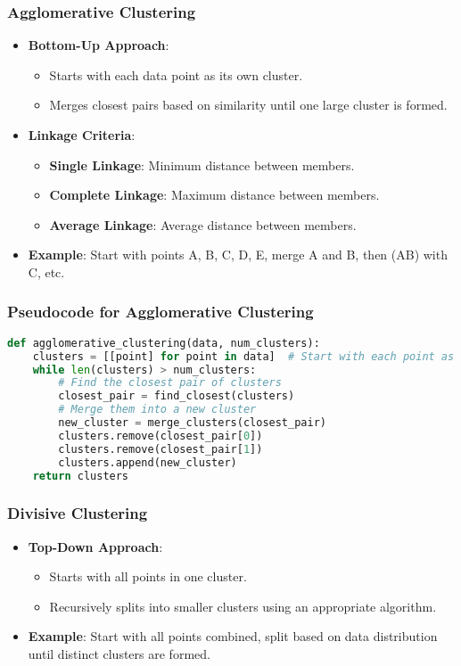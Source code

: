 \documentclass[aspectratio=169]{beamer}
\begin{document}
\begin{frame}
    \frametitle{Agglomerative Clustering}
    \begin{itemize}
        \item \textbf{Bottom-Up Approach}:
            \begin{itemize}
                \item Starts with each data point as its own cluster.
                \item Merges closest pairs based on similarity until one large cluster is formed.
            \end{itemize}
        \item \textbf{Linkage Criteria}:
            \begin{itemize}
                \item \textbf{Single Linkage}: Minimum distance between members.
                \item \textbf{Complete Linkage}: Maximum distance between members.
                \item \textbf{Average Linkage}: Average distance between members.
            \end{itemize}
        \item \textbf{Example}: 
            Start with points A, B, C, D, E, merge A and B, then (AB) with C, etc.
    \end{itemize}
\end{frame}

\begin{frame}[fragile]
    \frametitle{Pseudocode for Agglomerative Clustering}
    \begin{lstlisting}[language=Python]
def agglomerative_clustering(data, num_clusters):
    clusters = [[point] for point in data]  # Start with each point as a cluster
    while len(clusters) > num_clusters:
        # Find the closest pair of clusters
        closest_pair = find_closest(clusters)
        # Merge them into a new cluster
        new_cluster = merge_clusters(closest_pair)
        clusters.remove(closest_pair[0])
        clusters.remove(closest_pair[1])
        clusters.append(new_cluster)
    return clusters
    \end{lstlisting}
\end{frame}

\begin{frame}
    \frametitle{Divisive Clustering}
    \begin{itemize}
        \item \textbf{Top-Down Approach}:
            \begin{itemize}
                \item Starts with all points in one cluster.
                \item Recursively splits into smaller clusters using an appropriate algorithm.
            \end{itemize}
        \item \textbf{Example}:
            Start with all points combined, split based on data distribution until distinct clusters are formed.
    \end{itemize}
\end{frame}
\end{document}
